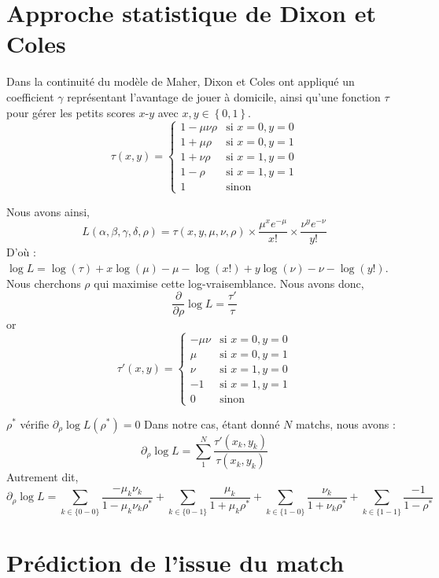 \section{Approche statistique de Dixon et Coles}
Dans la continuité du modèle de Maher, Dixon et Coles ont appliqué un coefficient $\gamma$ représentant 
l'avantage de jouer à domicile, ainsi qu'une fonction $\tau$ pour gérer 
les petits scores $x$-$y$ avec $x,y \in \left\{ 0,1 \right\} $.
\[
\tau(x, y) = 
\begin{cases} 
    1 - \mu \nu \rho & \text{si } x=0, y=0 \\ 
    1 + \mu \rho     & \text{si } x=0, y=1 \\ 
    1 + \nu \rho         & \text{si } x=1, y=0 \\ 
    1 - \rho             & \text{si } x=1, y=1 \\ 
    1                    & \text{sinon}
\end{cases}
\]

\noindent Nous avons ainsi, $$L(\alpha, \beta, \gamma, \delta, \rho) = \tau(x, y, \mu, \nu, \rho) \times 
\frac{\mu^x e^{-\mu}}{x!} \times \frac{\nu^y e^{-\nu}}{y!}$$
D'où : $\log L=\log(\tau)+x\log(\mu)-\mu-\log(x!) + y\log(\nu)-\nu-\log(y!)$. 
Nous cherchons $\rho$ qui maximise cette log-vraisemblance. Nous avons donc, 
$$\frac{\partial}{\partial\rho}\log L = \frac{\tau'}{\tau} $$ 
or 
\[\tau'(x,y)=
\begin{cases} 
    - \mu \nu  & \text{si } x=0, y=0 \\ 
    \mu        & \text{si } x=0, y=1 \\ 
    \nu        & \text{si } x=1, y=0 \\ 
    - 1        & \text{si } x=1, y=1 \\ 
    0          & \text{sinon}
\end{cases}
\]

$\rho^*$ vérifie $\partial_\rho \log L(\rho^*) = 0$
Dans notre cas, étant donné $N$ matchs, nous avons : 
$$\partial_\rho \log L = \sum_{1}^{N}\frac{\tau'(x_k,y_k)}{\tau(x_k,y_k)}$$
Autrement dit,
$$ \partial_\rho \log L =
\sum_{k \in \{0-0\}} \frac{-\mu_k \nu_k}{1 - \mu_k \nu_k \rho^*} 
+ \sum_{k \in \{0-1\}} \frac{\mu_k}{1 + \mu_k \rho^*} 
+ \sum_{k \in \{1-0\}} \frac{\nu_k}{1 + \nu_k \rho^*} 
+ \sum_{k \in \{1-1\}} \frac{-1}{1 - \rho^*}$$



\section{Prédiction de l'issue du match}

